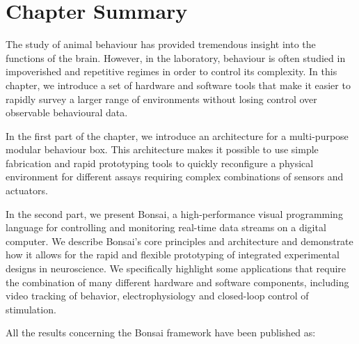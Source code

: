 				
\section{Chapter Summary}

The study of animal behaviour has provided tremendous insight into the functions of the brain. However, in the laboratory, behaviour is often studied in impoverished and repetitive regimes in order to control its complexity. In this chapter, we introduce a set of hardware and software tools that make it easier to rapidly survey a larger range of environments without losing control over observable behavioural data.

In the first part of the chapter, we introduce an architecture for a multi-purpose modular behaviour box. This architecture makes it possible to use simple fabrication and rapid prototyping tools to quickly reconfigure a physical environment for different assays requiring complex combinations of sensors and actuators.

In the second part, we present Bonsai, a high-performance visual programming language for controlling and monitoring real-time data streams on a digital computer. We describe Bonsai's core principles and architecture and demonstrate how it allows for the rapid and flexible prototyping of integrated experimental designs in neuroscience. We specifically highlight some applications that require the combination of many different hardware and software components, including video tracking of behavior, electrophysiology and closed-loop control of stimulation.

\bigskip
All the results concerning the Bonsai framework have been published as:

\pagebreak



